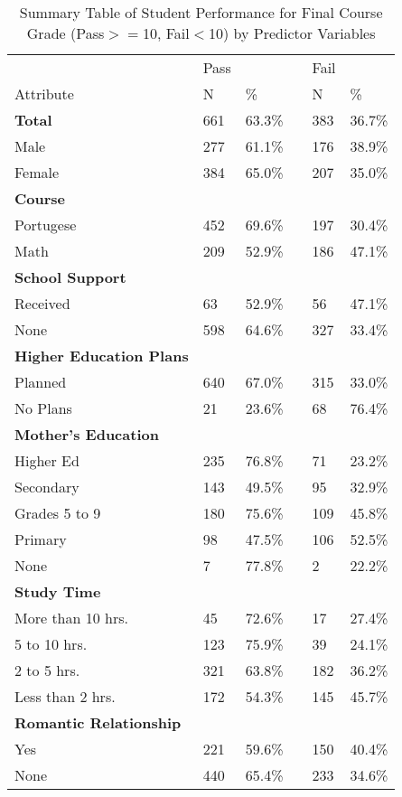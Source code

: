 \documentclass[sigconf]{acmart}
\begin{document}
 
 
\begin{table}
  \caption{Summary Table of Student Performance for Final Course Grade 
  (Pass$>=$10, Fail$<$10) by Predictor Variables }
  \label{tab:freq}
  \begin{tabular}{llllll}
    \toprule
                    &  Pass & & & Fail & \\
    Attribute       & N & \% &  & N & \% \\
    \midrule
    \textbf{Total}  & 661 & 63.3\% & & 383 & 36.7\% \\
    \midrule
    Male            & 277 & 61.1\% & & 176 & 38.9\%  \\
    Female          & 384 & 65.0\% & & 207 & 35.0\%  \\
    \midrule
    \textbf{Course} &  &  &  &  & \\
    Portugese       & 452 & 69.6\% & & 197 & 30.4\%  \\
    Math            & 209 & 52.9\% & & 186 & 47.1\%  \\  
    \midrule
    \textbf{School Support} &  &  &  &  & \\
    Received        &  63 & 52.9\% & &  56 & 47.1\%  \\
    None            & 598 & 64.6\% & & 327 & 33.4\%  \\ 
    \midrule    
    \textbf{Higher Education Plans} &  &  &  &  & \\
    Planned         & 640 & 67.0\% & & 315 & 33.0\%  \\
    No Plans        &  21 & 23.6\% & &  68 & 76.4\%  \\
    \midrule
    \textbf{Mother's Education} &  &  &  &  & \\
    Higher Ed       & 235 & 76.8\% & &  71 & 23.2\% \\
    Secondary       & 143 & 49.5\% & &  95 & 32.9\% \\
    Grades 5 to 9   & 180 & 75.6\% & & 109 & 45.8\% \\
    Primary         &  98 & 47.5\% & & 106 & 52.5\% \\
    None            &   7 & 77.8\% & &   2 & 22.2\% \\
    \midrule    
    \textbf{Study Time} &   &  &  &  &     \\
    More than 10 hrs. &  45 & 72.6\% & &  17 & 27.4\% \\
    5 to 10 hrs.      & 123 & 75.9\% & &  39 & 24.1\% \\
    2 to 5 hrs.       & 321 & 63.8\% & & 182 & 36.2\% \\    
    Less than 2 hrs.  & 172 & 54.3\% & & 145 & 45.7\% \\
    \midrule
    \textbf{Romantic Relationship} & &  &  &  & \\
    Yes             & 221 & 59.6\% & & 150 & 40.4\%  \\    
    None            & 440 & 65.4\% & & 233 & 34.6\%  \\
    
    \bottomrule
  \end{tabular}
\end{table}
\end{document}
